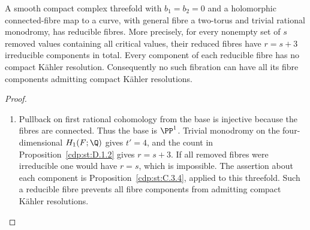 \begin{proposition}\hypertarget{tag-01G8}{}\label{cdp:st:D.2.1}

A smooth compact complex threefold with $b_1=b_2=0$ and a holomorphic
connected-fibre map to a curve, with general fibre a two-torus and
trivial rational monodromy, has reducible fibres. More precisely,
for every nonempty set of $s$ removed values containing all critical
values, their reduced fibres have $r=s+3$ irreducible components in
total. Every component of each reducible fibre has no compact
K\"ahler resolution. Consequently no such fibration can have all
its fibre components admitting compact K\"ahler resolutions.
\end{proposition}


\begin{proof}
\begin{enumerate}[label={$\langle1\rangle$\arabic*.},leftmargin=*]
\item 
Pullback on first rational cohomology from the base is injective because
the fibres are connected. Thus the base is $\PP^1$. Trivial monodromy on
the four-dimensional $H_1(F;\Q)$ gives $t'=4$, and the count in
Proposition~\ref{cdp:st:D.1.2} gives $r=s+3$. If all removed fibres were
irreducible one would have $r=s$, which is impossible. The assertion
about each component is Proposition~\ref{cdp:st:C.3.4}, applied to this
threefold. Such a reducible fibre prevents all fibre components from
admitting compact K\"ahler resolutions.

\end{enumerate}
\end{proof}